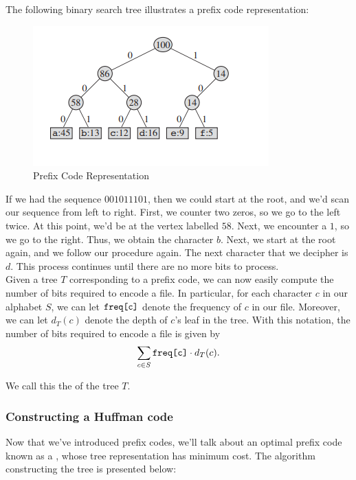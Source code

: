 The following binary search tree illustrates a prefix code representation:

\begin{figure}[h]
\centering
\includegraphics[scale=1]{media/prefix}
\caption{Prefix Code Representation}
\end{figure}

If we had the sequence $001011101$, then we could start at the root, and we'd scan our sequence from left to right. First, we counter two zeros, so we go to the left twice. At this point, we'd be at the vertex labelled $58$. Next, we encounter a $1$, so we go to the right. Thus, we obtain the character $b$. Next, we start at the root again, and we follow our procedure again. The next character that we decipher is $d$. This process continues until there are no more bits to process. \\


Given a tree $T$ corresponding to a prefix code, we can now easily compute the number of bits required to encode a file. In particular, for each character $c$ in our alphabet $S$, we can let $\verb!freq[c]!$ denote the frequency of $c$ in our file. Moreover, we can let $d_{T}(c)$ denote the depth of $c$'s leaf in the tree. With this notation, the number of bits required to encode a file is given by 
\[
\sum_{c \in S} \verb!freq[c]! \cdot d_{T}(c).
\]

We call this the  of the tree $T$. 

\subsubsection{Constructing a Huffman code}

Now that we've introduced prefix codes, we'll talk about an optimal prefix code known as a , whose tree representation has minimum cost. The algorithm constructing the tree is presented below: \\

\newpage

